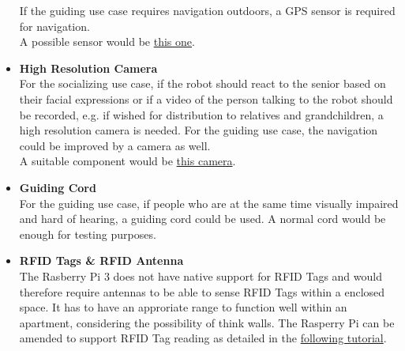 \documentclass[plainarticle,zihtitle,english,final,hyperref,utf8]{zihpub}
\begin{document}
\begin{itemize}
    If the guiding use case requires navigation outdoors, a GPS sensor is required for navigation.\\
    A possible sensor would be \href{https://www.superdroidrobots.com/shop/item.aspx/66-channel-ls20031-gps-receiver-module-mt3339-chipset/1647/}{this one}.\\
    \item \textbf{High Resolution Camera}\\
    For the socializing use case, if the robot should react to the senior based on their facial expressions or if a video of the person talking to the robot should be recorded, e.g. if wished for distribution to relatives and grandchildren, a high resolution camera is needed. For the guiding use case, the navigation could be improved by a camera as well.\\
    A suitable component would be \href{https://www.reichelt.de/raspberry-pi-kamera-8mp-v2-1-imx219pq-rasp-cam-2-p170853.html}{this camera}.\\
    \item \textbf{Guiding Cord}\\
    For the guiding use case, if people who are at the same time visually impaired and hard of hearing, a guiding cord could be used. A normal cord would be enough for testing purposes.
    \item \textbf{RFID Tags & RFID Antenna}\\
    The Rasberry Pi 3 does not have native support for RFID Tags and would therefore require antennas to be able to sense RFID Tags within a enclosed space. It has to have an approriate range to function well within an apartment, considering the possibility of think walls. The Rasperry Pi can be amended to support RFID Tag reading as detailed in the \href{https://maker.pro/raspberry-pi/tutorial/how-to-use-a-long-distance-rfid-reader-with-raspberry-pi-to-play-videos}{following tutorial}.
\end{itemize}

\newpage
\end{document}
